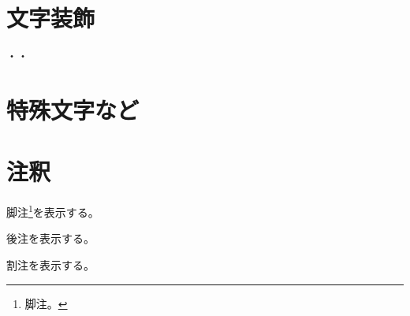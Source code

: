 \documentclass[uplatex,dvipdfmx,tate,book,twoside,openright,onecolumn,hanging_punctuation,
paper=b6,
line_length=40zh,
number_of_lines=15,
linegap=0.75zw, 
headfoot_sidemargin=12zw,
column_gap=0zh,
open_bracket_pos=nibu_tentsuki,%
]{jlreq}
\begin{document}
\section{文字装飾}
  ・・
\section{特殊文字など}








\section{注釈}

脚注\footnote{脚注。}を表示する。

後注を表示する。

割注を表示する。




\end{document}
